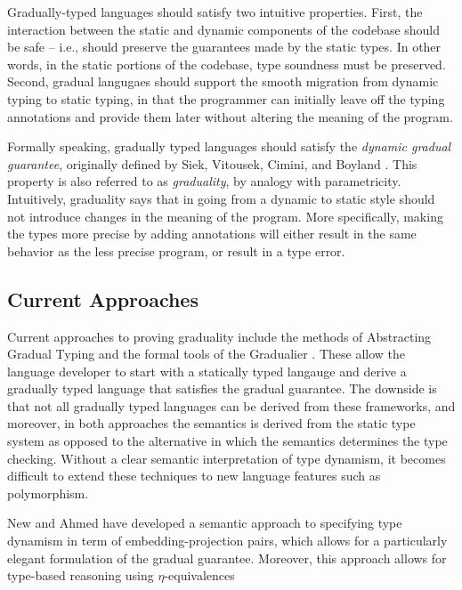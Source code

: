 \documentclass[acmsmall,screen]{acmart}
\begin{document}
  Gradually-typed languages should satisfy two intuitive properties.
  First, the interaction
  between the static and dynamic components of the codebase should be safe -- i.e., should
  preserve the guarantees made by the static types.
  In other words, in the static portions of the codebase, type soundness must be preserved.
  Second, gradual langugaes should support the smooth migration from dynamic typing
  to static typing, in that the programmer can initially leave off the
  typing annotations and provide them later without altering the meaning of the
  program.

  Formally speaking, gradually typed languages should satisfy the 
  \emph{dynamic gradual guarantee}, originally defined by Siek, Vitousek, Cimini,
  and Boyland \cite{siek_et_al:LIPIcs:2015:5031}.
  This property is also referred to as \emph{graduality}, by analogy with parametricity.
  Intuitively, graduality says that in going from a dynamic to static style should not
  introduce changes in the meaning of the program.
  More specifically, making the types more precise by adding annotations
  will either result in the same behavior as the less precise program,
  or result in a type error.

  
  \subsection{Current Approaches}
  Current approaches to proving graduality include the methods of Abstracting Gradual Typing
  \cite{garcia-clark-tanter2016} and the formal tools of the Gradualier \cite{cimini-siek2016}.
  These allow the language developer to start with a statically typed langauge and derive a
  gradually typed language that satisfies the gradual guarantee. The downside is that
  not all gradually typed languages can be derived from these frameworks, and moreover, in both
  approaches the semantics is derived from the static type system as opposed to the alternative
  in which the semantics determines the type checking. Without a clear semantic interpretation of type
  dynamism, it becomes difficult to extend these techniques to new language features such as polymorphism.

  New and Ahmed have developed a semantic approach to specifying type dynamism in term of
  embedding-projection pairs, which allows for a particularly elegant formulation of the
  gradual guarantee.
  Moreover, this approach allows for type-based reasoning using $\eta$-equivalences
  
\end{document}

